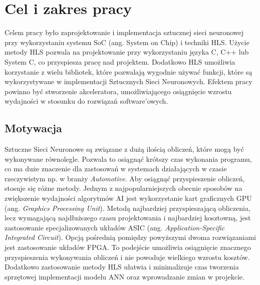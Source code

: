 \newpage %
\cleardoublepage %
\pagestyle{headings}

\section{Cel i zakres pracy}
Celem pracy było zaprojektowanie i implementacja sztucznej sieci neuronowej 
przy wykorzystaniu systemu SoC (ang. System on Chip) i techniki HLS. 
Użycie metody HLS pozwala na projektowanie  przy wykorzystaniu języka 
C, C++ lub System C, co przyspiesza pracę nad projektem. Dodatkowo HLS umożliwia
korzystanie z wielu bibliotek, które pozwalają wygodnie używać funkcji,
które są wykorzystywane w implementacji Sztucznych Sieci Neuronowych. 
Efektem pracy powinno być stworzenie akceleratora, umożliwiającego osiągnięcie 
wzrostu wydajności w stosunku do rozwiązań software’owych.

\subsection{Motywacja}
Sztuczne Sieci Neuronowe są związane z dużą ilością obliczeń, które mogą 
być wykonywane równolegle. Pozwala to osiągnąć krótszy czas wykonania 
programu, co ma duże znaczenie dla zastosowań w systemach działających 
w czasie rzeczywistym np. w branży \emph{Automotive}. Aby osiągnąć przyspieszenie 
obliczeń, stosuje się różne metody. Jednym z najpopularniejszych obecnie sposobów 
na zwiększenie wydajności algorytmów AI jest wykorzystanie kart graficznych GPU 
(ang. \emph{Graphics Processing Unit}). Metodą najbardziej przyspieszającą obliczenia,
lecz wymagającą najdłuższego czasu projektowania i najbardziej kosztowną,
jest zastosowanie specjalizowanych układów ASIC (ang. \emph{Application-Specific 
Integrated Circuit}). Opcją pośrednią pomiędzy powyższymi dwoma rozwiązaniami
jest zastosowanie układów FPGA. To podejście umożliwia osiągnięcie znacznego
przyspieszenia wykonywania obliczeń i nie powoduje wielkiego wzrostu kosztów. 
Dodatkowo zastosowanie metody HLS ułatwia i minimalizuje czas tworzenia sprzętowej 
implementacji modelu ANN oraz wprowadzanie zmian w projekcie. 

